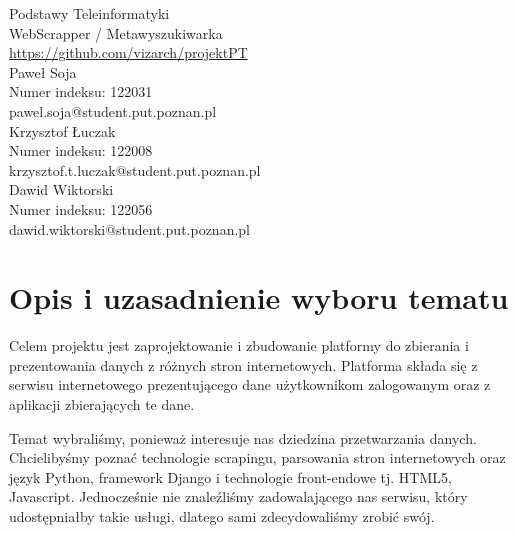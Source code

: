 \documentclass[12pt, titlepage]{article}
\begin{document}
	\begin{titlepage}
		\thispagestyle{firstpage}
		\centering
			\vspace*{5cm}
			{\huge Podstawy Teleinformatyki\\
				WebScrapper / Metawyszukiwarka\\}
			\vspace{6cm}
			{\large \url{https://github.com/vizarch/projektPT}\\}
			\vspace{1cm}
			{\large
			Paweł Soja\\
			Numer indeksu: 122031\\
			pawel.soja@student.put.poznan.pl\\
			\vspace{0.5cm}
			Krzysztof Łuczak\\
			Numer indeksu: 122008\\
			krzysztof.t.luczak@student.put.poznan.pl\\
			\vspace{0.5cm}
			Dawid Wiktorski\\
			Numer indeksu: 122056\\
			dawid.wiktorski@student.put.poznan.pl\\}
	\end{titlepage}
	\tableofcontents
	\listoftables
	
	\newpage
	\section{Opis i uzasadnienie wyboru tematu}
	Celem projektu jest zaprojektowanie i zbudowanie platformy do zbierania i prezentowania danych z różnych stron internetowych. Platforma składa się z serwisu internetowego prezentującego dane użytkownikom zalogowanym oraz z aplikacji zbierających te dane.
	
	Temat wybraliśmy, ponieważ interesuje nas dziedzina przetwarzania danych. Chcielibyśmy poznać technologie scrapingu, parsowania stron internetowych oraz język Python, framework Django i technologie front-endowe tj. HTML5, Javascript. Jednocześnie nie znaleźliśmy zadowalającego nas serwisu, który udostępniałby takie usługi, dlatego sami zdecydowaliśmy zrobić swój.
\end{document}
